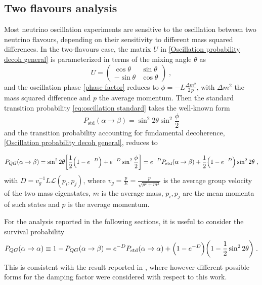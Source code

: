 \documentclass[11pt]{article}
\begin{document}
\subsection{Two flavours analysis}
Most neutrino oscillation experiments are  sensitive to the oscillation between  two neutrino flavours, depending on their sensitivity to different mass squared differences. In the two-flavours case, the matrix $U$ in \eqref{Oscillation probability decoh general} is parameterized in terms of the mixing angle $\theta$ as
\begin{equation}
    U = \begin{pmatrix}
\cos \theta & \sin \theta \\
-\sin \theta & \cos \theta
\end{pmatrix}\;,
\end{equation}
and the oscillation phase \eqref{phase factor}  reduces to $\phi= -L\frac{\Delta m^2}{2\,p}$, with $\Delta m^2$ the mass squared difference and $p$ the average momentum.
Then the standard transition probability \eqref{eq:oscillation standard} takes the well-known form
\begin{equation}\label{eq:standard osc 2 flavours}
    P_{\text{std}}(\alpha\to\beta) = \sin^2{2\theta}\sin^2{\frac{\phi}{2}}
\end{equation}
and the transition probability accounting for fundamental decoherence, \eqref{Oscillation probability decoh general}, reduces to

\begin{equation}\label{Probability decoherence two flavour}
    P_{QG}(\alpha\to\beta) =  \sin^2{2\theta}\qty[\frac{1}{2}\qty(1-e^{-D})+e^{-D}\sin^2{\frac{\phi}{2}}] = e^{-D} P_{\text{std}}(\alpha\to\beta)+\frac{1}{2}\qty(1-e^{-D})\sin^2{2\theta}\;,
\end{equation}
with $D= v_g^{-1}L\mathcal{L}(p_i,p_j)$, where $v_g = \frac{p}{E} = \frac{p}{\sqrt{p^2+m^2}}$ is the average group velocity of the two mass eigenstates, $m$ is the average mass, $p_i,p_j$ are the mean momenta of such states and $p$ is the average momentum.

For the analysis reported in the following sections, it is useful to consider the survival probability 
\begin{equation}\label{Survival probability two flavours}
    P_{QG}(\alpha\to\alpha) \equiv 1- P_{QG}(\alpha\to\beta)= e^{-D} P_{\text{std}}(\alpha\to\alpha) + \qty(1-e^{-D})\qty(1-\frac{1}{2}\sin^2 2\theta)\;.
\end{equation}
This is consistent with the result reported in \cite{Lisi:2000zt}, where however different possible forms for the damping factor were considered with respect to this work.
\end{document}
